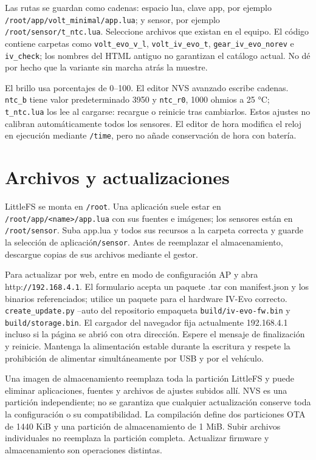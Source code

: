 Las rutas se guardan como cadenas: espacio lua, clave app, por ejemplo \nolinkurl{/root/app/volt_minimal/app.lua}; y sensor, por ejemplo \nolinkurl{/root/sensor/t_ntc.lua}. Seleccione archivos que existan en el equipo. El código contiene carpetas como \nolinkurl{volt_evo_v_l}, \nolinkurl{volt_iv_evo_t}, \nolinkurl{gear_iv_evo_norev} e \nolinkurl{iv_check}; los nombres del HTML antiguo no garantizan el catálogo actual. No dé por hecho que la variante sin marcha atrás la muestre.

El brillo usa porcentajes de 0–100. El editor NVS avanzado escribe cadenas. \nolinkurl{ntc_b} tiene valor predeterminado 3950 y \nolinkurl{ntc_r0}, 1000 ohmios a 25 °C; \nolinkurl{t_ntc.lua} los lee al cargarse: recargue o reinicie tras cambiarlos. Estos ajustes no calibran automáticamente todos los sensores. El editor de hora modifica el reloj en ejecución mediante \nolinkurl{/time}, pero no añade conservación de hora con batería.

\section{Archivos y actualizaciones}
LittleFS se monta en \nolinkurl{/root}. Una aplicación suele estar en \nolinkurl{/root/app/<name>/app.lua} con sus fuentes e imágenes; los sensores están en \nolinkurl{/root/sensor}. Suba app.lua y todos sus recursos a la carpeta correcta y guarde la selección de aplicació\nolinkurl{n/sensor}. Antes de reemplazar el almacenamiento, descargue copias de sus archivos mediante el gestor.

Para actualizar por web, entre en modo de configuración AP y abra http:\nolinkurl{//192.168.4.1}. El formulario acepta un paquete .tar con manifest.json y los binarios referenciados; utilice un paquete para el hardware IV-Evo correcto. \nolinkurl{create_update.py} --auto del repositorio empaqueta \nolinkurl{build/iv-evo-fw.bin} y \nolinkurl{build/storage.bin}. El cargador del navegador fija actualmente 192.168.4.1 incluso si la página se abrió con otra dirección. Espere el mensaje de finalización y reinicie. Mantenga la alimentación estable durante la escritura y respete la prohibición de alimentar simultáneamente por USB y por el vehículo.

Una imagen de almacenamiento reemplaza toda la partición LittleFS y puede eliminar aplicaciones, fuentes y archivos de ajustes subidos allí. NVS es una partición independiente; no se garantiza que cualquier actualización conserve toda la configuración o su compatibilidad. La compilación define dos particiones OTA de 1440 KiB y una partición de almacenamiento de 1 MiB. Subir archivos individuales no reemplaza la partición completa. Actualizar firmware y almacenamiento son operaciones distintas.


